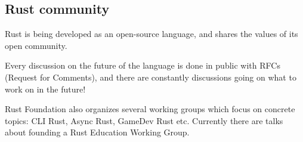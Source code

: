 \documentclass[usenames,twocolumn,dvipsnames,10pt,a4wide]{article}
\begin{document}
\subsection{Rust community}
	Rust is being developed as an open-source language, and
	shares the values of its open community.

	
	Every discussion on the future of the language is done
	in public with RFCs (Request for Comments), and there
	are constantly discussions going on what to work on in
	the future!

	
	Rust Foundation also organizes several working groups
	which focus on concrete topics: CLI Rust, Async Rust,
	GameDev Rust etc. Currently there are talks about
	founding a Rust Education Working Group.
\end{document}
